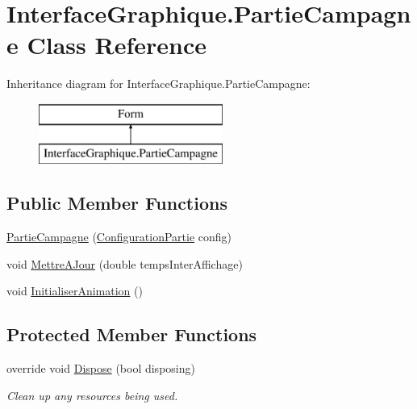 \hypertarget{class_interface_graphique_1_1_partie_campagne}{\section{Interface\-Graphique.\-Partie\-Campagne Class Reference}
\label{class_interface_graphique_1_1_partie_campagne}
}
Inheritance diagram for Interface\-Graphique.\-Partie\-Campagne\-:\begin{figure}[H]
\begin{center}
\leavevmode
\includegraphics[height=2.000000cm]{class_interface_graphique_1_1_partie_campagne}
\end{center}
\end{figure}
\subsection*{Public Member Functions}
\begin{DoxyCompactItemize}
\item 
\hyperlink{class_interface_graphique_1_1_partie_campagne_a09c97c7d20e5f81ae694c7d5a8902cfc}{Partie\-Campagne} (\hyperlink{class_interface_graphique_1_1_configuration_partie}{Configuration\-Partie} config)
\item 
void \hyperlink{class_interface_graphique_1_1_partie_campagne_abd2bb254a6fc89e1fcf4866f26a33b5e}{Mettre\-A\-Jour} (double temps\-Inter\-Affichage)
\item 
void \hyperlink{class_interface_graphique_1_1_partie_campagne_a195a2c4b17dc6ebc55240ff5f9e822b4}{Initialiser\-Animation} ()
\end{DoxyCompactItemize}
\subsection*{Protected Member Functions}
\begin{DoxyCompactItemize}
\item 
override void \hyperlink{class_interface_graphique_1_1_partie_campagne_a7722af971723630e8fee2f3ac1bfa07e}{Dispose} (bool disposing)
\begin{DoxyCompactList}\small\item\em Clean up any resources being used. \end{DoxyCompactList}\end{DoxyCompactItemize}


